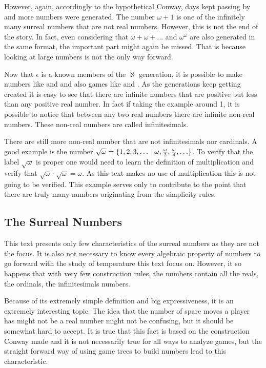 However, again, accordingly to the hypothetical Conway, days kept passing by and more numbers were generated. The number $\omega+1$ is one of the infinitely many surreal numbers that are not real numbers. However, this is not the end of the story. In fact, even considering that $\omega + \omega + ...$ and $\omega^\omega$ are also generated in the same format, the important part might again be missed. That is because looking at large numbers is not the only way forward.

Now that $\epsilon$ is a known members of the $\aleph$ generation, it is possible to make numbers like  and  and also games like  and . As the generations keep getting created it is easy to see that there are infinite numbers that are positive but less than any positive real number. In fact if taking the example around 1, it is possible to notice that between any two real numbers there are infinite non-real numbers. These non-real numbers are called infinitesimals.

There are still more non-real number that are not infinitesimals nor cardinals. A good example is the number $\sqrt{\omega} = \mbox{$\{1,2,3,\ldots\:|\:\omega, \frac{\omega}{2},\frac{\omega}{4},\ldots\}$}$. To verify that the label $\sqrt{\omega}$ is proper one would need to learn the definition of multiplication and verify that $\sqrt{\omega} \cdot \sqrt{\omega} = \omega$. As this text makes no use of multiplication this is not going to be verified. This example serves only to contribute to the point that there are truly many numbers originating from the simplicity rules.

\subsection*{The Surreal Numbers}

This text presents only few characteristics of the surreal numbers as they are not the focus. It is also not necessary to know every algebraic property of numbers to go forward with the study of temperature this text focus on. However, it so happens that with very few construction rules, the numbers contain all the reals, the ordinals, the infinitesimals numbers.

Because of its extremely simple definition and big expressiveness, it is an extremely interesting topic. The idea that the number of spare moves a player has might not be a real number might not be confusing, but it should be somewhat hard to accept. It is true that this fact is based on the construction Conway made and it is not necessarily true for all ways to analyze games, but the straight forward way of using game trees to build numbers lead to this characteristic.

